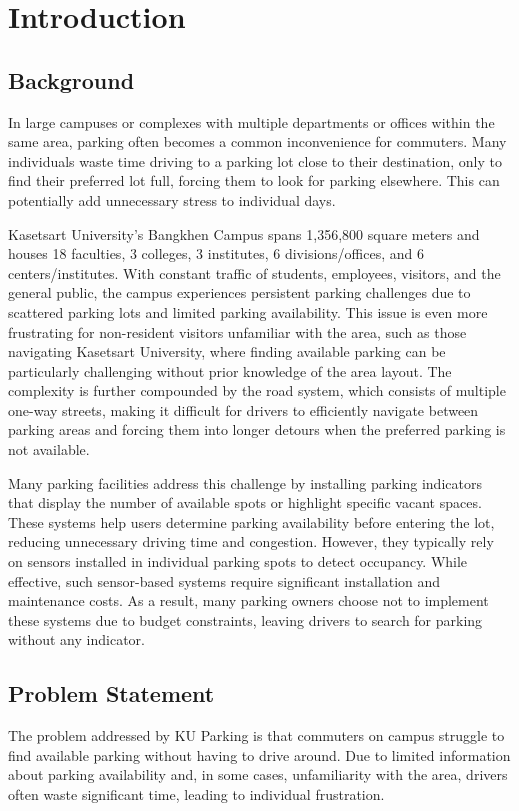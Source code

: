\chapter{Introduction}
\label{chap:introduction}

\section{Background}
\label{section:background}

In large campuses or complexes with multiple departments or offices within the same area, parking often becomes a common inconvenience for commuters.
Many individuals waste time driving to a parking lot close to their destination, only to find their preferred lot full, forcing them to look for parking elsewhere. This can potentially add unnecessary stress to individual days.


Kasetsart University's Bangkhen Campus spans 1,356,800 square meters and houses 18 faculties, 3 colleges, 3 institutes, 6 divisions/offices, and 6 centers/institutes\cite{ku_campus_info}. With constant traffic of students, employees, visitors, and the general public, the campus experiences persistent parking challenges due to scattered parking lots and limited parking availability. This issue is even more frustrating for non-resident visitors unfamiliar with the area, such as those navigating Kasetsart University, where finding available parking can be particularly challenging without prior knowledge of the area layout. The complexity is further compounded by the road system, which consists of multiple one-way streets, making it difficult for drivers to efficiently navigate between parking areas and forcing them into longer detours when the preferred parking is not available.


Many parking facilities address this challenge by installing parking indicators that display the number of available spots or highlight specific vacant spaces.
These systems help users determine parking availability before entering the lot, reducing unnecessary driving time and congestion. However, they typically rely on sensors installed in individual parking spots to detect occupancy.
While effective, such sensor-based systems require significant installation and maintenance costs.
As a result, many parking owners choose not to implement these systems due to budget constraints, leaving drivers to search for parking without any indicator.

\section{Problem Statement}
\label{section:problem-statement}
The problem addressed by KU Parking is that commuters on campus struggle to find available parking without having to drive around. Due to limited information about parking availability and, in some cases, unfamiliarity with the area, drivers often waste significant time, leading to individual frustration. 

